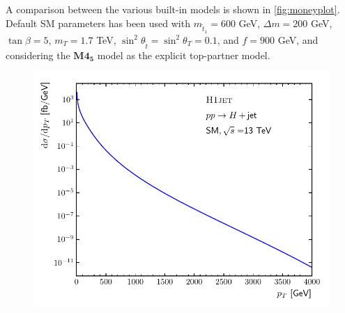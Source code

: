\documentclass[12pt]{article}
\begin{document}
A comparison between the various built-in models is shown in \autoref{fig:moneyplot}. Default SM parameters has been used with $m_{\tilde{t}_1} = 600$ GeV, $\Delta m = 200$ GeV, $\tan\beta = 5$, $m_T = 1.7$ TeV, $\sin^2\theta_{\tilde{t}} = \sin^2\theta_{T} = 0.1$, and $f = 900$ GeV, and considering the $\textbf{M4}_{\textbf{5}}$ model as the explicit top-partner model. 


\begin{figure}[tbh] 
\centering
\begin{minipage}{.485\textwidth}
  \centering
  \includegraphics[width=\linewidth]{figures/H1jetresult.pdf}
  \label{fig:h1jetresult}
\end{minipage}%
\hfill%
\begin{minipage}{.485\textwidth}
  \centering

\end{minipage}
\end{figure}
\end{document}
